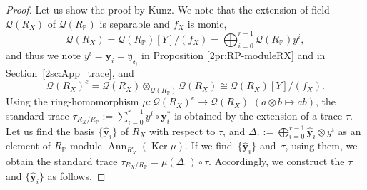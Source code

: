 \documentclass[pdftex]{sigma}
\def\PP{{\mathbb P}}
\def\bby{{\mathbf y}}
\def\cQ{{\mathcal Q}}
\def\fe{{\mathfrak e}}
\def\fy{{\mathfrak y}}
\def\hby{\widehat {{\mathbf y}}}
\def\Ker{\operatorname{Ker}}
\def\Ann{\operatorname{Ann}}
\numberwithin{equation}{section}
\begin{document}
\begin{proof}Let us show the proof by Kunz.
We note that the extension of field $\cQ(R_X)$ of $\cQ(R_\PP)$ is separable and $f_X$ is monic,
\[
\cQ(R_X)=\cQ(R_\PP)[Y]/(f_X) = \bigoplus_{i=0}^{r-1} \cQ(R_\PP)y^i,
\]
and thus we note $y^i =\bby_i = \fy_{\fe_i}$ in Proposition \ref{2pr:RP-moduleRX} and in Section~\ref{2sc:App_trace}, and
\[
\cQ(R_X)^e = \cQ(R_X)\otimes_{\cQ(R_\PP)} \cQ(R_X) \cong \cQ(R_X)[Y]/(f_X).
\]
Using the ring-homomorphism $\mu\colon \cQ(R_X)^e\to \cQ(R_X)$ $(a\otimes b \mapsto ab)$, the standard trace $\tau_{R_X/R_\PP}:=\sum_{i=0}^{r-1} y^i \circ \bby_i^*$ is obtained by the extension of a trace $\tau$.
Let us find the basis $\{\hby_i\}$ of $R_X$ with respect to $\tau$, and $\Delta_\tau:=\bigoplus_{i=0}^{r-1} \hby_i\otimes y^i$ as an element of $R_\PP$-module $\Ann_{R_X^e}(\Ker \mu)$. If we find~$\{\hby_i\}$ and~$\tau$, using them, we obtain the standard trace $\tau_{R_X/R_\PP}=\mu(\Delta_\tau)\circ \tau$.
Accordingly, we construct the $\tau$ and $\{\hby_i\}$ as follows.


\end{proof}
\end{document}
